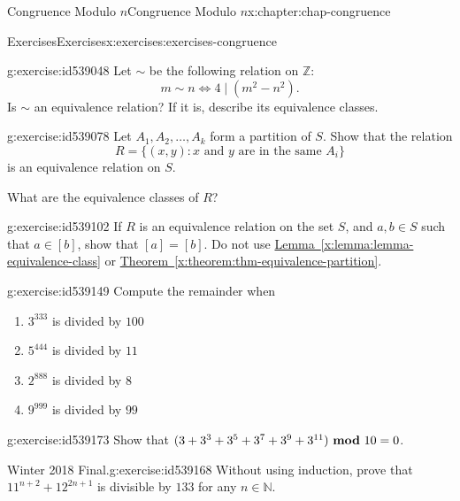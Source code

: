 \documentclass[oneside,10pt,]{book}
\newcommand{\xreffont}{\relax}
\numberwithin{equation}{section}
\newcommand{\mmod}[1]{\ \mathrm{\bf mod}\ #1}
\begin{document}
\begin{chapterptx}{Congruence Modulo \(n\)}{}{Congruence Modulo \(n\)}{}{}{x:chapter:chap-congruence}
\begin{exercises-section}{Exercises}{}{Exercises}{}{}{x:exercises:exercises-congruence}
\begin{divisionexercise}{3}{}{}{g:exercise:id539048}%
Let \(\sim\) be the following relation on \(\mathbb{Z}\):%
\begin{equation*}
m \sim n \Leftrightarrow 4 \mid (m^2 - n^2)\text{.}
\end{equation*}
Is \(\sim\) an equivalence relation? If it is, describe its equivalence classes.%
\end{divisionexercise}%
\begin{divisionexercise}{4}{}{}{g:exercise:id539078}%
Let \(A_1, A_2, \ldots, A_k\) form a partition of \(S\). Show that the relation%
\begin{equation*}
R = \{(x,y) : x \text{ and } y \text{ are in the same $A_i$}\}
\end{equation*}
is an equivalence relation on \(S\).%
\par
What are the equivalence classes of \(R\)?%
\end{divisionexercise}%
\begin{divisionexercise}{5}{}{}{g:exercise:id539102}%
If \(R\) is an equivalence relation on the set \(S\), and \(a, b \in S\) such that \(a \in [b]\), show that \([a] = [b]\). Do not use \hyperref[x:lemma:lemma-equivalence-class]{Lemma~{\xreffont\ref{x:lemma:lemma-equivalence-class}}} or \hyperref[x:theorem:thm-equivalence-partition]{Theorem~{\xreffont\ref{x:theorem:thm-equivalence-partition}}}.%
\end{divisionexercise}%
\begin{divisionexercise}{6}{}{}{g:exercise:id539149}%
Compute the remainder when%
\begin{enumerate}[label=(\alph*)]
\item{}\(3^{333}\) is divided by \(100\)%
\item{}\(5^{444}\) is divided by \(11\)%
\item{}\(2^{888}\) is divided by \(8\)%
\item{}\(9^{999}\) is divided by \(99\)%
\end{enumerate}
%
\end{divisionexercise}%
\begin{divisionexercise}{7}{}{}{g:exercise:id539173}%
Show that \((3 + 3^3 + 3^5 + 3^7 + 3^9 + 3^{11}) \mmod{10} = 0\).%
\end{divisionexercise}%
\begin{divisionexercise}{8}{Winter 2018 Final.}{}{g:exercise:id539168}%
Without using induction, prove that \(11^{n+2} + 12^{2n+1}\) is divisible by \(133\) for any \(n \in \mathbb{N}\).%

\end{divisionexercise}
\end{exercises-section}
\end{chapterptx}
\end{document}

